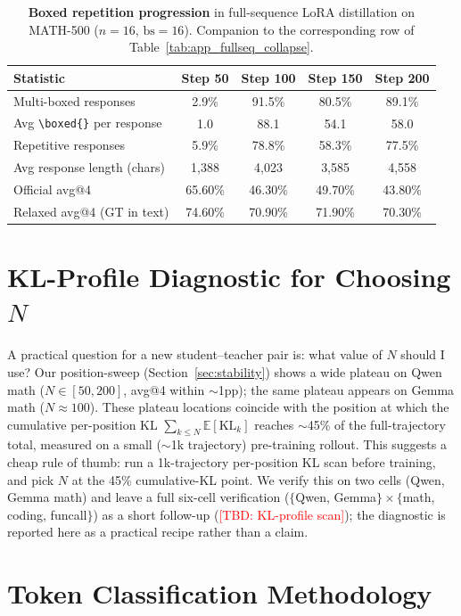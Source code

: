 \documentclass{article}
\newcommand{\KL}{\mathrm{KL}}
\newcommand{\bboxed}{\texttt{\textbackslash boxed\{\}}}
\newcommand{\tbd}[1]{\textcolor{red}{[TBD: #1]}}
\begin{document}
\begin{table}[!htbp]
\centering
\caption{\textbf{Boxed repetition progression} in full-sequence LoRA distillation on MATH-500 ($n{=}16$, $\text{bs}{=}16$). Companion to the corresponding row of Table~\ref{tab:app_fullseq_collapse}.}
\label{tab:app_boxed}
\small
\begin{tabular}{lcccc}
\toprule
\textbf{Statistic} & \textbf{Step 50} & \textbf{Step 100} & \textbf{Step 150} & \textbf{Step 200} \\
\midrule
Multi-boxed responses & 2.9\% & 91.5\% & 80.5\% & 89.1\% \\
Avg \bboxed{} per response & 1.0 & 88.1 & 54.1 & 58.0 \\
Repetitive responses & 5.9\% & 78.8\% & 58.3\% & 77.5\% \\
Avg response length (chars) & 1,388 & 4,023 & 3,585 & 4,558 \\
\midrule
Official avg@4 & 65.60\% & 46.30\% & 49.70\% & 43.80\% \\
Relaxed avg@4 (GT in text) & 74.60\% & 70.90\% & 71.90\% & 70.30\% \\
\bottomrule
\end{tabular}
\end{table}


\section{KL-Profile Diagnostic for Choosing $N$}
\label{app:kl_profile}

A practical question for a new student--teacher pair is: what value of $N$ should I use? Our position-sweep (Section~\ref{sec:stability}) shows a wide plateau on Qwen math ($N \in [50, 200]$, avg@4 within $\sim$1pp); the same plateau appears on Gemma math ($N \approx 100$). These plateau locations coincide with the position at which the cumulative per-position KL $\sum_{k \le N} \mathbb{E}[\KL_k]$ reaches $\sim$45\% of the full-trajectory total, measured on a small ($\sim$1k trajectory) pre-training rollout. This suggests a cheap rule of thumb: run a 1k-trajectory per-position KL scan before training, and pick $N$ at the 45\% cumulative-KL point. We verify this on two cells (Qwen, Gemma math) and leave a full six-cell verification ($\{$Qwen, Gemma$\}\times\{$math, coding, funcall$\}$) as a short follow-up (\tbd{KL-profile scan}); the diagnostic is reported here as a practical recipe rather than a claim.

\section{Token Classification Methodology}
\label{app:token_classification}
\end{document}
